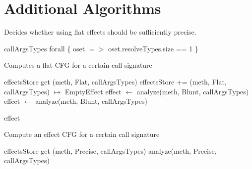 \documentclass[a4paper]{article}
\begin{document}
\newpage
\appendix
\section{Additional Algorithms}

\begin{algorithm}
\caption{Decides whether using flat effects should be sufficiently
precise.}\label{algo:pt:shouldwe}
\begin{algorithmic}[1]
    \State \Return callArgsTypes forall \{ oset $=>$ oset.resolveTypes.size == 1 \}
\EndFunction
\end{algorithmic}
\end{algorithm}

\begin{algorithm}
\caption{Computes a flat CFG for a certain call signature}\label{algo:pt:getflatcfg}
\begin{algorithmic}[1]
        \State \Return effectsStore get (meth, Flat, callArgsTypes)
    \Else
        \State effectsStore += (meth, Flat, callArgsTypes) $\mapsto$ EmptyEffect
        \State effect $\gets$ analyze(meth, Blunt, callArgsTypes)
        \Repeat
            \State effect $\gets$ analyze(meth, Blunt, callArgsTypes)

        \State \Return effect
    \EndIf
\EndFunction
\end{algorithmic}
\end{algorithm}

\begin{algorithm}
\caption{Compute an effect CFG for a certain call signature}\label{algo:pt:getanalyzedcfg}
\begin{algorithmic}[1]
        \State \Return effectsStore get (meth, Precise, callArgsTypes)
    \Else
        \State \Return analyze(meth, Precise, callArgsTypes)
    \EndIf
\EndFunction
\end{algorithmic}
\end{algorithm}
\end{document}
